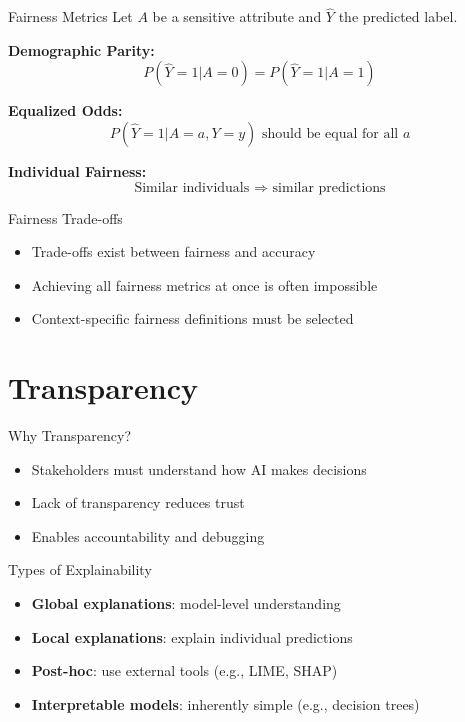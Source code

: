 \documentclass{beamer}
\begin{document}
\begin{frame}{Fairness Metrics}
Let \( A \) be a sensitive attribute and \( \hat{Y} \) the predicted label.

\textbf{Demographic Parity:}
\[
P(\hat{Y} = 1 | A = 0) = P(\hat{Y} = 1 | A = 1)
\]

\textbf{Equalized Odds:}
\[
P(\hat{Y} = 1 | A = a, Y = y) \text{ should be equal for all } a
\]

\textbf{Individual Fairness:}
\[
\text{Similar individuals } \Rightarrow \text{ similar predictions}
\]
\end{frame}

\begin{frame}{Fairness Trade-offs}
\begin{itemize}
    \item Trade-offs exist between fairness and accuracy
    \item Achieving all fairness metrics at once is often impossible
    \item Context-specific fairness definitions must be selected
\end{itemize}
\end{frame}

\section{Transparency}
\begin{frame}{Why Transparency?}
\begin{itemize}
    \item Stakeholders must understand how AI makes decisions
    \item Lack of transparency reduces trust
    \item Enables accountability and debugging
\end{itemize}
\end{frame}

\begin{frame}{Types of Explainability}
\begin{itemize}
    \item \textbf{Global explanations}: model-level understanding
    \item \textbf{Local explanations}: explain individual predictions
    \item \textbf{Post-hoc}: use external tools (e.g., LIME, SHAP)
    \item \textbf{Interpretable models}: inherently simple (e.g., decision trees)
\end{itemize}
\end{frame}
\end{document}
